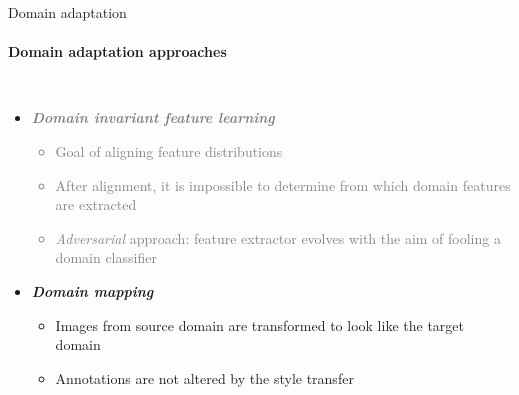 \documentclass[aspectratio=141]{beamer}
\begin{document}
\begin{frame}{Domain adaptation}
    \framesubtitle{Domain adaptation approaches}
    
    \begin{columns}
        \vspace*{-9mm}
        \begin{itemize}
            \item \textcolor<2->{gray}{
                \textbf{\textit{Domain invariant feature learning}}
                \begin{itemize}
                    \item \textcolor<2->{gray}{Goal of aligning feature distributions}
                    \item \textcolor<2->{gray}{After alignment, it is impossible to determine from which domain features are extracted}
                    \item \textcolor<2->{gray}{\textit{Adversarial} approach: feature extractor evolves with the aim of fooling a domain classifier}
                \end{itemize}
            }
            \vspace*{2mm}
            \item<2-> \textbf{\textit{Domain mapping}}
                \begin{itemize}
                    \item Images from source domain are transformed to look like the target domain
                    \item Annotations are not altered by the style transfer
                \end{itemize}
        \end{itemize}
        

\end{columns}
\end{frame}
\end{document}
